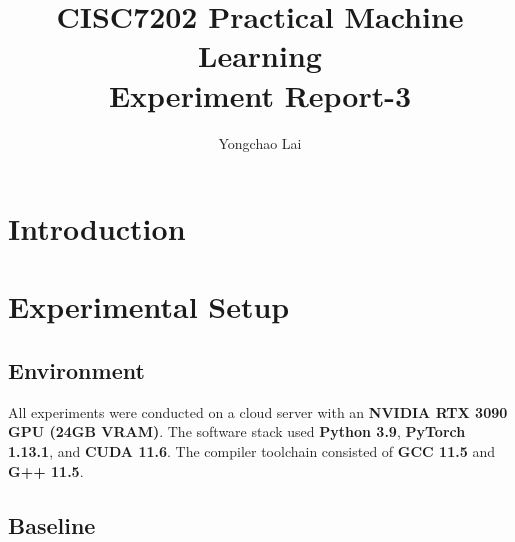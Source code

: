 \documentclass[sigconf, final, screen]{acmart}
\begin{document}
\renewcommand\footnotetextcopyrightpermission[1]{}
\pagestyle{plain}

\title{ CISC7202 Practical Machine Learning \\ Experiment Report-3 }

\author{  
Yongchao Lai } 

\begin{abstract}

\end{abstract}
 
\maketitle

\section{Introduction}

\section{Experimental Setup}

\subsection{Environment}
All experiments were conducted on a cloud server with an \textbf{NVIDIA RTX 3090 GPU (24GB VRAM)}. The software stack used \textbf{Python 3.9}, \textbf{PyTorch 1.13.1}, and \textbf{CUDA 11.6}. The compiler toolchain consisted of \textbf{GCC 11.5} and \textbf{G++ 11.5}.

\subsection{Baseline}


\end{document}

